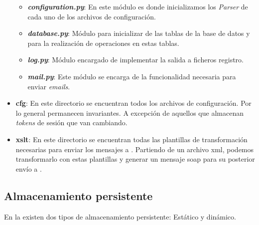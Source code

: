 \begin{itemize}
			\begin{itemize}
				\item [\textendash] \textbf{\textit{configuration.py}}: En este módulo es donde inicializamos los \textit{Parser} de cada uno de los archivos de configuración.
				\item [\textendash] \textbf{\textit{database.py}}: Módulo para inicializar de las tablas de la base de datos y para la realización de operaciones en estas tablas.
				\item [\textendash] \textbf{\textit{log.py}}: Módulo encargado de implementar la salida a ficheros registro.
				\item [\textendash] \textbf{\textit{mail.py}}: Este módulo se encarga de la funcionalidad necesaria para enviar \textit{emails}.
			\end{itemize}
			
	\item[\textendash] \textbf{cfg}: En este directorio se encuentran todos los archivos de configuración. 
	Por lo general permanecen invariantes. A excepción de aquellos que almacenan \textit{tokens} de sesión que van cambiando.
	\item[\textendash] \textbf{xslt}: En este directorio se encuentran todas las plantillas de transformación necesarias para enviar los mensajes a \wday.
	Partiendo de un archivo \acrshort{xml}, podemos transformarlo con estas plantillas y generar un mensaje \acrshort{soap} para su posterior envío a \wday.
	

\end{itemize}




\subsection{Almacenamiento persistente}

En la \iface{} existen dos tipos de almacenamiento persistente: Estático y dinámico.


